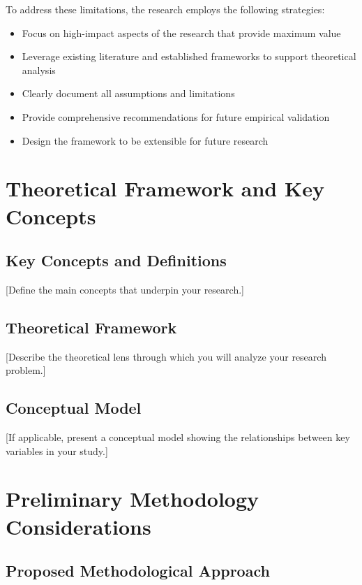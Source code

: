 \documentclass[12pt,a4paper]{article}
\begin{document}
To address these limitations, the research employs the following strategies:
\begin{itemize}
    \item Focus on high-impact aspects of the research that provide maximum value
    \item Leverage existing literature and established frameworks to support theoretical analysis
    \item Clearly document all assumptions and limitations
    \item Provide comprehensive recommendations for future empirical validation
    \item Design the framework to be extensible for future research
\end{itemize}

\section{Theoretical Framework and Key Concepts}
\label{sec:theory}

\subsection{Key Concepts and Definitions}
[Define the main concepts that underpin your research.]

\subsection{Theoretical Framework}
[Describe the theoretical lens through which you will analyze your research problem.]

\subsection{Conceptual Model}
[If applicable, present a conceptual model showing the relationships between key variables in your study.]

\section{Preliminary Methodology Considerations}
\label{sec:methodology-preview}

\subsection{Proposed Methodological Approach}
\end{document}
